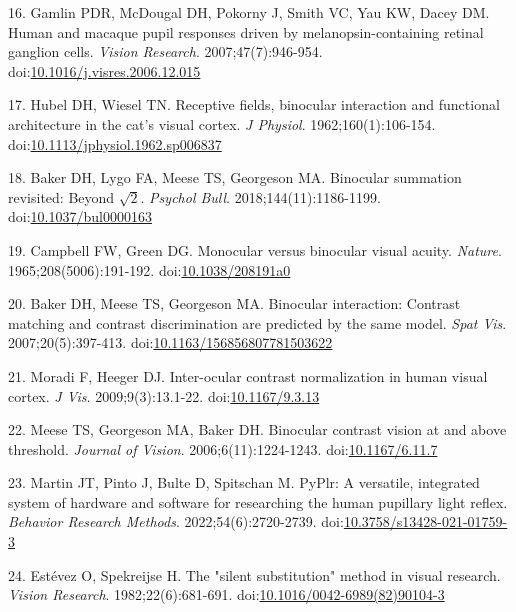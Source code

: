\documentclass[
]{article}
\begin{document}
\leavevmode\hypertarget{ref-Gamlin2007}{}%
16. Gamlin PDR, McDougal DH, Pokorny J, Smith VC, Yau KW, Dacey DM. Human and macaque pupil responses driven by melanopsin-containing retinal ganglion cells. \emph{Vision Research}. 2007;47(7):946-954. doi:\href{https://doi.org/10.1016/j.visres.2006.12.015}{10.1016/j.visres.2006.12.015}

\leavevmode\hypertarget{ref-Hubel1962}{}%
17. Hubel DH, Wiesel TN. Receptive fields, binocular interaction and functional architecture in the cat's visual cortex. \emph{J Physiol}. 1962;160(1):106-154. doi:\href{https://doi.org/10.1113/jphysiol.1962.sp006837}{10.1113/jphysiol.1962.sp006837}

\leavevmode\hypertarget{ref-Baker2018}{}%
18. Baker DH, Lygo FA, Meese TS, Georgeson MA. Binocular summation revisited: Beyond \(\sqrt{2}\). \emph{Psychol Bull}. 2018;144(11):1186-1199. doi:\href{https://doi.org/10.1037/bul0000163}{10.1037/bul0000163}

\leavevmode\hypertarget{ref-Campbell1965}{}%
19. Campbell FW, Green DG. Monocular versus binocular visual acuity. \emph{Nature}. 1965;208(5006):191-192. doi:\href{https://doi.org/10.1038/208191a0}{10.1038/208191a0}

\leavevmode\hypertarget{ref-Baker2007}{}%
20. Baker DH, Meese TS, Georgeson MA. Binocular interaction: Contrast matching and contrast discrimination are predicted by the same model. \emph{Spat Vis}. 2007;20(5):397-413. doi:\href{https://doi.org/10.1163/156856807781503622}{10.1163/156856807781503622}

\leavevmode\hypertarget{ref-Moradi2009}{}%
21. Moradi F, Heeger DJ. Inter-ocular contrast normalization in human visual cortex. \emph{J Vis}. 2009;9(3):13.1-22. doi:\href{https://doi.org/10.1167/9.3.13}{10.1167/9.3.13}

\leavevmode\hypertarget{ref-Meese2006}{}%
22. Meese TS, Georgeson MA, Baker DH. Binocular contrast vision at and above threshold. \emph{Journal of Vision}. 2006;6(11):1224-1243. doi:\href{https://doi.org/10.1167/6.11.7}{10.1167/6.11.7}

\leavevmode\hypertarget{ref-Martin2022}{}%
23. Martin JT, Pinto J, Bulte D, Spitschan M. PyPlr: A versatile, integrated system of hardware and software for researching the human pupillary light reflex. \emph{Behavior Research Methods}. 2022;54(6):2720-2739. doi:\href{https://doi.org/10.3758/s13428-021-01759-3}{10.3758/s13428-021-01759-3}

\leavevmode\hypertarget{ref-Estevez1982}{}%
24. Estévez O, Spekreijse H. The "silent substitution" method in visual research. \emph{Vision Research}. 1982;22(6):681-691. doi:\href{https://doi.org/10.1016/0042-6989(82)90104-3}{10.1016/0042-6989(82)90104-3}
\end{document}
